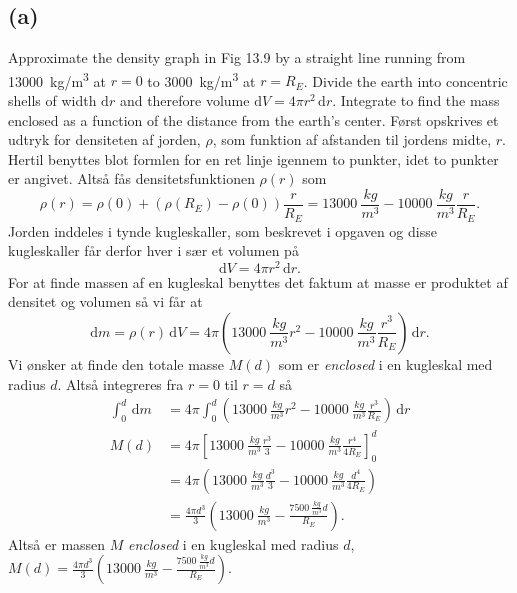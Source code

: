 \documentclass[12pt]{article}
\theoremstyle{definition}
\begin{document}
\subsection*{(a)}
Approximate the density graph in Fig 13.9 by a straight line running from \qty{13000}{kg/m^3} at $r = 0$ to \qty{3000}{kg/m^3} at $r = R_E$. Divide the earth into concentric shells of width $\mathrm{d}r$ and therefore volume $\mathrm{d}V = 4\pi r^2 \, \mathrm{d}r$. Integrate to find the mass enclosed as a function of the distance from the earth's center.
\bigbreak
Først opskrives et udtryk for densiteten af jorden, $\rho$, som funktion af afstanden til jordens midte, $r$. Hertil benyttes blot formlen for en ret linje igennem to punkter, idet to punkter er angivet. Altså fås densitetsfunktionen $\rho(r)$ som
\[ 
  \rho(r) = \rho(0) + \left( \rho(R_E) - \rho(0) \right) \frac{r}{R_E} = \qty{13000}{\frac{kg}{m^3}}  - \qty{10000}{\frac{kg}{m^3}}  \frac{r}{R_E}
.\]
Jorden inddeles i tynde kugleskaller, som beskrevet i opgaven og disse kugleskaller får derfor hver i sær et volumen på 
\[ 
  \mathrm{d}V = 4\pi r^2 \, \mathrm{d}r
.\]
For at finde massen af en kugleskal benyttes det faktum at masse er produktet af densitet og volumen så vi får at
\[ 
  \mathrm{d}m = \rho(r) \, \mathrm{d}V = 4\pi \left( \qty{13000}{\frac{kg}{m^3}} r^2 - \qty{10000}{\frac{kg}{m^3}}   \frac{r^3}{R_E}  \right) \, \mathrm{d}r
.\]
Vi ønsker at finde den totale masse $M(d)$ som er \textit{enclosed} i en kugleskal med radius $d$. Altså integreres fra $r = 0$ til $r = d$ så
\begin{align*}
  \int_{0}^{d} \, \mathrm{d}m &= 4\pi \int_{0}^{d} \left( \qty{13000}{\frac{kg}{m^3}}   r^2 - \qty{10000}{\frac{kg}{m^3}}  \frac{r^3}{R_E} \right) \, \mathrm{d}r \\
  M(d) &= 4\pi \left[ \qty{13000}{\frac{kg}{m^3}}  \frac{r^3}{3} - \qty{10000}{\frac{kg}{m^3}}  \frac{r^{4}}{4R_E} \right]_{0}^{d} \\
  &= 4\pi \left( \qty{13000}{\frac{kg}{m^3}}  \frac{d^3}{3} - \qty{10000}{\frac{kg}{m^3}}  \frac{d^{4}}{4R_E} \right) \\
  &= \frac{4\pi d^3}{3} \left( \qty{13000}{\frac{kg}{m^3}}  - \frac{\qty{7500}{\frac{kg}{m^3}} d}{R_E}  \right)
.\end{align*}
Altså er massen $M$ \textit{enclosed} i en kugleskal med radius $d$, \underline{\underline{$M(d) = \frac{4\pi d^3}{3} \left( \qty{13000}{\frac{kg}{m^3}}  - \frac{\qty{7500}{\frac{kg}{m^3}} d}{R_E} \right)$}}.
\end{document}

